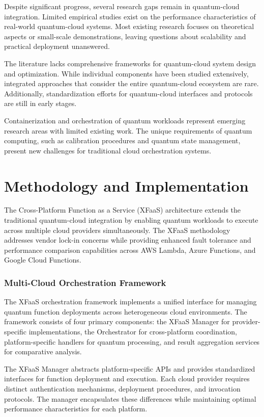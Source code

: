 \documentclass[onecolumn]{IEEEtran}
\begin{document}
Despite significant progress, several research gaps remain in quantum-cloud integration. Limited empirical studies exist on the performance characteristics of real-world quantum-cloud systems. Most existing research focuses on theoretical aspects or small-scale demonstrations, leaving questions about scalability and practical deployment unanswered.

The literature lacks comprehensive frameworks for quantum-cloud system design and optimization. While individual components have been studied extensively, integrated approaches that consider the entire quantum-cloud ecosystem are rare. Additionally, standardization efforts for quantum-cloud interfaces and protocols are still in early stages.

Containerization and orchestration of quantum workloads represent emerging research areas with limited existing work. The unique requirements of quantum computing, such as calibration procedures and quantum state management, present new challenges for traditional cloud orchestration systems.

\section{Methodology and Implementation}

The Cross-Platform Function as a Service (XFaaS) architecture extends the traditional quantum-cloud integration by enabling quantum workloads to execute across multiple cloud providers simultaneously. The XFaaS methodology addresses vendor lock-in concerns while providing enhanced fault tolerance and performance comparison capabilities across AWS Lambda, Azure Functions, and Google Cloud Functions.

\subsubsection{Multi-Cloud Orchestration Framework}

The XFaaS orchestration framework implements a unified interface for managing quantum function deployments across heterogeneous cloud environments. The framework consists of four primary components: the XFaaS Manager for provider-specific implementations, the Orchestrator for cross-platform coordination, platform-specific handlers for quantum processing, and result aggregation services for comparative analysis.

The XFaaS Manager abstracts platform-specific APIs and provides standardized interfaces for function deployment and execution. Each cloud provider requires distinct authentication mechanisms, deployment procedures, and invocation protocols. The manager encapsulates these differences while maintaining optimal performance characteristics for each platform.
\end{document}
